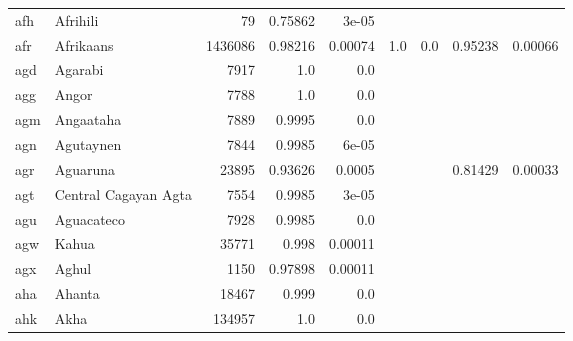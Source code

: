 \documentclass[11pt]{article}
\begin{document}
\begin{table*}[ht]
{\begin{tabular}{llrrrrrrr}
afh         & Afrihili         & 79         & 0.75862         & 3e-05         &          &          &          &          \\

afr         & Afrikaans         & 1436086         & 0.98216         & 0.00074         & 1.0         & 0.0         & 0.95238         & 0.00066         \\

agd         & Agarabi         & 7917         & 1.0         & 0.0         &          &          &          &          \\

agg         & Angor         & 7788         & 1.0         & 0.0         &          &          &          &          \\

agm         & Angaataha         & 7889         & 0.9995         & 0.0         &          &          &          &          \\

agn         & Agutaynen         & 7844         & 0.9985         & 6e-05         &          &          &          &          \\

agr         & Aguaruna         & 23895         & 0.93626         & 0.0005         &          &          & 0.81429         & 0.00033         \\

agt         & Central Cagayan Agta         & 7554         & 0.9985         & 3e-05         &          &          &          &          \\

agu         & Aguacateco         & 7928         & 0.9985         & 0.0         &          &          &          &          \\

agw         & Kahua         & 35771         & 0.998         & 0.00011         &          &          &          &          \\

agx         & Aghul         & 1150         & 0.97898         & 0.00011         &          &          &          &          \\

aha         & Ahanta         & 18467         & 0.999         & 0.0         &          &          &          &          \\

ahk         & Akha         & 134957         & 1.0         & 0.0         &          &          &          &          \\


\end{tabular}}
\end{table*}
\end{document}
